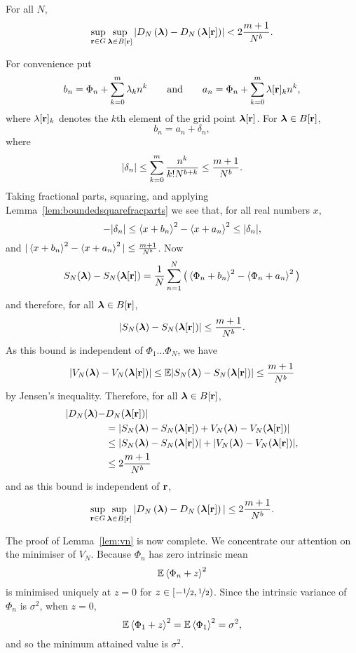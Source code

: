 \documentclass[journal]{IEEEtran}
\begin{document}
 \begin{lemma}\label{lem:supBVn}
For all $N$,
\[
 \sup_{\mathbf{r}\in G}\sup_{ \boldsymbol{\lambda}  \in B[\mathbf{r}] }\left\vert D_N\left(  \boldsymbol{\lambda} \right) - D_N\left(  \boldsymbol{\lambda}[\mathbf{r}] \right)\right\vert < 2\frac{m+1}{N^b}.
 \]
 \end{lemma}
 \begin{IEEEproof}
For convenience put 
\[
b_n = \Phi_n + \sum_{k = 0}^{m}{\lambda_k n^k} \qquad \text{and} \qquad  a_n = \Phi_n + \sum_{k = 0}^{m}{\lambda[\mathbf{r}]_k n^k},
\] 
where $\lambda[\mathbf{r}]_k$ denotes the $k$th element of the grid point $\boldsymbol{\lambda}[\mathbf{r}]$. For $\boldsymbol{\lambda} \in B[\mathbf{r}]$,
\[
b_n = a_n + \delta_n,
\]
where 
\[
\vert \delta_n \vert \leq \sum_{k=0}^m\frac{n^k}{k! N^{b+k}} \leq \frac{m+1}{N^{b}}.
\] 
Taking fractional parts, squaring, and applying Lemma~\ref{lem:boundedsquarefracparts} we see that, for all real numbers $x$,
\[
 -|\delta_n| \leq \left\langle x + b_n \right\rangle^2 -  \left\langle x + a_n \right\rangle^2  \leq |\delta_n|,
\]
and $|\left\langle x + b_n \right\rangle^2 -  \left\langle x + a_n \right\rangle^2| \leq \tfrac{m+1}{N^b}$. Now
\[
S_N(\boldsymbol{\lambda}) - S_N(\boldsymbol{\lambda}[\mathbf{r}]) =  \frac{1}{N}\sum_{n=1}^{N}\big( \left\langle \Phi_n + b_n \right\rangle^2 -  \left\langle \Phi_n + a_n \right\rangle^2 \big)
\]
and therefore, for all $\boldsymbol{\lambda} \in B[\mathbf{r}]$,
\[
\vert S_N(\boldsymbol{\lambda}) - S_N(\boldsymbol{\lambda}[\mathbf{r}]) \vert \leq \frac{m+1}{N^b}.
\]
As this bound is independent of $\Phi_1 \dots \Phi_N$, we have
\[
\vert  V_N(\boldsymbol{\lambda}) - V_N(\boldsymbol{\lambda}[\mathbf{r}]) \vert \leq {\mathbb E} \vert  S_N(\boldsymbol{\lambda}) - S_N(\boldsymbol{\lambda}[\mathbf{r}]) \vert \leq \frac{m+1}{N^b}
\]
by Jensen's inequality.  Therefore, for all $\boldsymbol{\lambda} \in B[\mathbf{r}]$,
 \begin{align*}
 \vert  D_N(\boldsymbol{\lambda}) - &D_N(\boldsymbol{\lambda}[\mathbf{r}])  \vert \\
&= \vert  S_N(\boldsymbol{\lambda}) - S_N(\boldsymbol{\lambda}[\mathbf{r}]) + V_N(\boldsymbol{\lambda}) - V_N(\boldsymbol{\lambda}[\mathbf{r}])  \vert \\
&\leq \vert  S_N(\boldsymbol{\lambda}) - S_N(\boldsymbol{\lambda}[\mathbf{r}]) \vert + \vert V_N(\boldsymbol{\lambda}) - V_N(\boldsymbol{\lambda}[\mathbf{r}])  \vert,  \\
&\leq 2\frac{m+1}{N^{b}}
\end{align*}
 and as this bound is independent of $\mathbf{r}$,
\[
\sup_{\mathbf{r}\in G}\sup_{ \boldsymbol{\lambda}  \in B[\mathbf{r}] }\vert  D_N\left(  \boldsymbol{\lambda} \right) - D_N\left(  \boldsymbol{\lambda}[\mathbf{r}] \right)  \vert \leq 2\frac{m+1}{N^{b}}.
\]
 \end{IEEEproof}

The proof of Lemma~\ref{lem:vn} is now complete.  We concentrate our attention on the minimiser of $V_N$. Because $\Phi_n$ has zero intrinsic mean 
\begin{equation}\label{eq:Efracpartmined}
\expect \fracpart{ \Phi_n + z }^{2}
\end{equation}
is minimised uniquely at $z = 0$ for $z \in [-\nicefrac{1}{2}, \nicefrac{1}{2})$.  Since the intrinsic variance of $\Phi_n$ is $\sigma^2$, when $z = 0$,
\begin{equation}\label{eq:Efracpartphi}
\expect\fracpart{\Phi_1+z}^{2} = \expect\fracpart{\Phi_1}^{2} = \sigma^2,
\end{equation}
and so the minimum attained value is $\sigma^2$.
\end{document}
